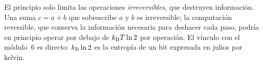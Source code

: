 \addtocounter{definicion}{1}%

\begin{observacion}
El principio solo limita las operaciones \emph{irreversibles}, que destruyen información. Una suma $c=a+b$ que sobrescribe $a$ y $b$ es irreversible; la computación reversible, que conserva la información necesaria para deshacer cada paso, podría en principio operar por debajo de $k_{\mathrm{B}} T\ln 2$ por operación. El vínculo con el módulo~6 es directo: $k_{\mathrm{B}}\ln 2$ es la entropía de un bit expresada en julios por kelvin.
\end{observacion}

